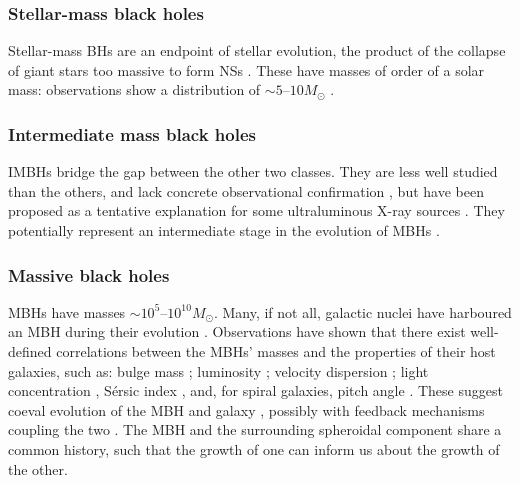 \subsubsection{Stellar-mass black holes}

Stellar-mass BHs are an endpoint of stellar evolution, the product of the collapse of giant stars too massive to form NSs \citep{Postnov2006}. These have masses of order of a solar mass: observations show a distribution of $\sim5$--$10M_\odot$ \citep{Ozel2010,Farr2010}. 

\subsubsection{Intermediate mass black holes}

IMBHs bridge the gap between the other two classes. They are less well studied than the others, and lack concrete observational confirmation \citep{Miller2009a}, but have been proposed as a tentative explanation for some ultraluminous X-ray sources \citep{Feng2011}. They potentially represent an intermediate stage in the evolution of MBHs \citep{Graham2013}.

\subsubsection{Massive black holes}

MBHs have masses $\sim10^5$--$10^{10} M_\odot$. Many, if not all, galactic nuclei have harboured an MBH during their evolution \citep{Lynden-Bell1971, Soltan1982, Rees1984}. Observations have shown that there exist well-defined correlations between the MBHs' masses and the properties of their host galaxies, such as: bulge mass \citep{Kormendy1995,Haring2004,Graham2012a}; luminosity \citep{Magorrian1998,Marconi2003,Graham2013}; velocity dispersion \citep{Ferrarese2000,Gebhardt2000,Tremaine2002,Graham2011}; light concentration \citep{Graham2001}, S{\'e}rsic index \citep{Graham2007a,Savorgnan2013}, and, for spiral galaxies, pitch angle \citep{Seigar2008,Berrier2013}. These suggest coeval evolution of the MBH and galaxy \citep{Peng2007, Jahnke2011}, possibly with feedback mechanisms coupling the two \citep{Haiman2004, Volonteri2009}. The MBH and the surrounding spheroidal component share a common history, such that the growth of one can inform us about the growth of the other.

